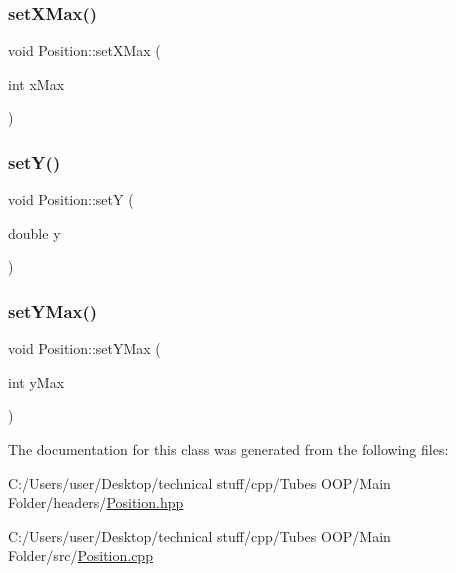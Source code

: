 \mbox{\label{class_position_acb2c50493422d1a6faceb3ed7e2a8caf}} 
\subsubsection{\texorpdfstring{set\+X\+Max()}{setXMax()}}
{\footnotesize\ttfamily void Position\+::set\+X\+Max (\begin{DoxyParamCaption}\item[{int}]{x\+Max }\end{DoxyParamCaption})}

\mbox{\label{class_position_a5fbae78d4986da56edad357a82e1e376}} 
\subsubsection{\texorpdfstring{set\+Y()}{setY()}}
{\footnotesize\ttfamily void Position\+::setY (\begin{DoxyParamCaption}\item[{double}]{y }\end{DoxyParamCaption})}

\mbox{\label{class_position_a715321d96c4195ddb3381b52a6cf547c}} 
\subsubsection{\texorpdfstring{set\+Y\+Max()}{setYMax()}}
{\footnotesize\ttfamily void Position\+::set\+Y\+Max (\begin{DoxyParamCaption}\item[{int}]{y\+Max }\end{DoxyParamCaption})}



The documentation for this class was generated from the following files\+:\begin{DoxyCompactItemize}
\item 
C\+:/\+Users/user/\+Desktop/technical stuff/cpp/\+Tubes O\+O\+P/\+Main Folder/headers/\mbox{\hyperlink{_position_8hpp}{Position.\+hpp}}\item 
C\+:/\+Users/user/\+Desktop/technical stuff/cpp/\+Tubes O\+O\+P/\+Main Folder/src/\mbox{\hyperlink{_position_8cpp}{Position.\+cpp}}\end{DoxyCompactItemize}

